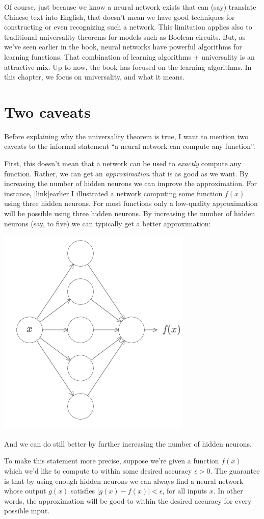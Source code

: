 \documentclass[a4paper,twoside,10pt]{book}
\begin{document}
Of course, just because we know a neural network exists that can (say) translate Chinese text into English, that doesn't mean we have good techniques for constructing or even recognizing such a network. This limitation applies also to traditional universality theorems for models such as Boolean circuits. But, as we've seen earlier in the book, neural networks have powerful algorithms for learning functions. That combination of learning algorithms + universality is an attractive mix. Up to now, the book has focused on the learning algorithms. In this chapter, we focus on universality, and what it means.


\section{Two caveats}
Before explaining why the universality theorem is true, I want to mention two caveats to the informal statement ``a neural network can compute any function''.

First, this doesn't mean that a network can be used to \textit{exactly} compute any function. Rather, we can get an \textit{approximation} that is as good as we want. By increasing the number of hidden neurons we can improve the approximation. For instance, [link]earlier I illustrated a network computing some function $f(x)$ using three hidden neurons. For most functions only a low-quality approximation will be possible using three hidden neurons. By increasing the number of hidden neurons (say, to five) we can typically get a better approximation:
\begin{center}
	\includegraphics[width=0.45\linewidth]{figures/ch4/tikz402}
\end{center}
And we can do still better by further increasing the number of hidden neurons.

To make this statement more precise, suppose we're given a function $f(x)$ which we'd like to compute to within some desired accuracy $\epsilon>0$. The guarantee is that by using enough hidden neurons we can always find a neural network whose output $g(x)$ satisfies $|g(x)-f(x)|<\epsilon$, for all inputs $x$. In other words, the approximation will be good to within the desired accuracy for every possible input.
\end{document}
